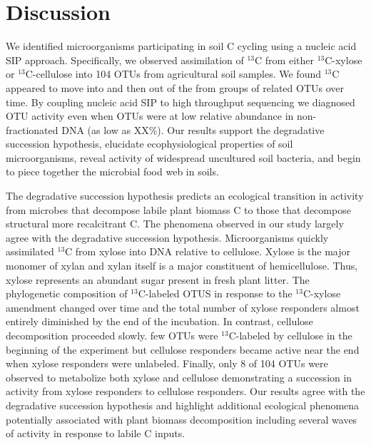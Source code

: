 \section{Discussion} 
We identified microorganisms participating in soil C cycling using a nucleic
acid SIP approach. Specifically, we observed assimilation of $^{13}$C from
either $^{13}$C-xylose or $^{13}$C-cellulose into 104 OTUs from agricultural
soil samples. We found $^{13}$C appeared to move into and then out of the from
groups of related OTUs over time. By coupling nucleic acid SIP to high
throughput sequencing we diagnosed OTU activity even when OTUs were at low
relative abundance in non-fractionated DNA (as low as XX\%). Our results
support the degradative succession hypothesis, elucidate ecophysiological
properties of soil microorganisms, reveal activity of widespread uncultured
soil bacteria, and begin to piece together the microbial food web in soils. 

The degradative succession hypothesis predicts an ecological transition in
activity from microbes that decompose labile plant biomass C to those that
decompose structural more recalcitrant C. The phenomena observed in our study
largely agree with the degradative succession hypothesis. Microorganisms
quickly assimilated $^{13}$C from xylose into DNA relative to cellulose. Xylose
is the major monomer of xylan and xylan itself is a major constituent of
hemicellulose. Thus, xylose represents an abundant sugar present in fresh plant
litter. The phylogenetic composition of $^{13}$C-labeled OTUS in response to
the $^{13}$C-xylose amendment changed over time and the total number of xylose
responders almost entirely diminished by the end of the incubation. In
contrast, cellulose decomposition proceeded slowly. few OTUs were
$^{13}$C-labeled by cellulose in the beginning of the experiment but cellulose
responders became active near the end when xylose responders were unlabeled.
Finally, only 8 of 104 OTUs were observed to metabolize both xylose and
cellulose demonstrating a succession in activity from xylose responders to
cellulose responders. Our results agree with the degradative succession
hypothesis and highlight additional ecological phenomena potentially associated
with plant biomass decomposition including several waves of activity in
response to labile C inputs.  

